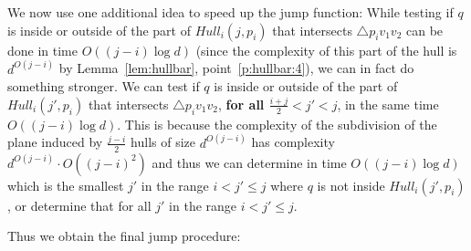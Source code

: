 \documentclass[10pt,a4paper]{amsart}
\newcommand{\Hull}{\mathit{Hull}}
\newcommand{\NN}{\mathit{NN}}
\begin{document}
%
%

We now use one additional idea to speed up the jump function: While testing if $q$ is inside or outside of the part of $\Hull_i(j,p_i)$ that intersects $\triangle p_iv_1v_2$ can be done in time $O((j-i)\log d)$ (since the complexity of this part of the hull is $d^{O(j-i)}$ by Lemma~\ref{lem:hullbar}, point~\ref{p:hullbar:4}), we can in fact do something stronger. We can test if $q$ is inside or outside of the part of $\Hull_i(j',p_i)$ that intersects $\triangle p_iv_1v_2$, \textbf{for all $\frac{i+j}{2}<j'<j$}, in the same time $O((j-i)\log d)$. This is because the complexity of the subdivision of the plane induced by  $\frac{j-i}{2}$ hulls of size $d^{O(j-i)}$ has complexity  $d^{O(j-i)}\cdot O((j-i)^{2})$ and thus we can determine in time $O((j-i)\log d)$ which is the smallest $j'$ in the range $i<j'\leq j$ where $q$ is not inside $\Hull_i(j',p_i)$, or determine that for all $j'$ in the range $i<j'\leq j$.

Thus we obtain the final jump procedure:


\end{document}
